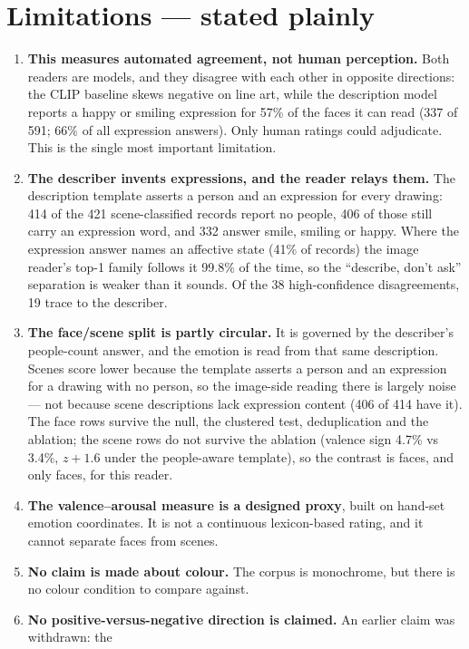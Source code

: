 \documentclass[11pt,a4paper]{article}
\begin{document}
\section{Limitations --- stated plainly}

\begin{enumerate}
\item \textbf{This measures automated agreement, not human perception.} Both readers are models, and
they disagree with each other in opposite directions: the CLIP baseline skews negative on line art,
while the description model reports a happy or smiling expression for 57\% of the faces it can read
(337 of 591; 66\% of all expression answers). Only human ratings could adjudicate. This is the single
most important limitation.
\item \textbf{The describer invents expressions, and the reader relays them.} The description template
asserts a person and an expression for every drawing: 414 of the 421 scene-classified records report
no people, 406 of those still carry an expression word, and 332 answer smile, smiling or happy. Where
the expression answer names an affective state (41\% of records) the image reader's top-1 family
follows it 99.8\% of the time, so the ``describe, don't ask'' separation is weaker than it sounds.
Of the 38 high-confidence disagreements, 19 trace to the describer.
\item \textbf{The face/scene split is partly circular.} It is governed by the describer's people-count
answer, and the emotion is read from that same description. Scenes score lower because the template
asserts a person and an expression for a drawing with no person, so the image-side reading there is
largely noise --- not because scene descriptions lack expression content (406 of 414 have it). The
face rows survive the null, the clustered test, deduplication and the ablation; the scene rows do not
survive the ablation (valence sign 4.7\% vs 3.4\%, $z{+}1.6$ under the people-aware template), so
the contrast is faces, and only faces, for this reader.
\item \textbf{The valence--arousal measure is a designed proxy}, built on hand-set emotion
coordinates. It is not a continuous lexicon-based rating, and it cannot separate faces from scenes.
\item \textbf{No claim is made about colour.} The corpus is monochrome, but there is no colour
condition to compare against.
\item \textbf{No positive-versus-negative direction is claimed.} An earlier claim was withdrawn: the

\end{enumerate}
\end{document}

